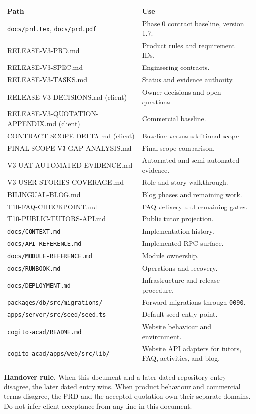 \documentclass[11pt,a4paper]{article}
\newcommand{\code}[1]{\texttt{#1}}
\begin{document}
{\footnotesize
\begin{tabular}{@{}L{7.2cm}L{8.4cm}@{}}
\toprule
\textbf{Path} & \textbf{Use} \\
\midrule
\code{docs/prd.tex}, \code{docs/prd.pdf} & Phase 0 contract baseline, version 1.7. \\
RELEASE-V3-PRD.md & Product rules and requirement IDs. \\
RELEASE-V3-SPEC.md & Engineering contracts. \\
RELEASE-V3-TASKS.md & Status and evidence authority. \\
RELEASE-V3-DECISIONS.md (client) & Owner decisions and open questions. \\
RELEASE-V3-QUOTATION-APPENDIX.md (client) & Commercial baseline. \\
CONTRACT-SCOPE-DELTA.md (client) & Baseline versus additional scope. \\
FINAL-SCOPE-V3-GAP-ANALYSIS.md & Final-scope comparison. \\
V3-UAT-AUTOMATED-EVIDENCE.md & Automated and semi-automated evidence. \\
V3-USER-STORIES-COVERAGE.md & Role and story walkthrough. \\
BILINGUAL-BLOG.md & Blog phases and remaining work. \\
T10-FAQ-CHECKPOINT.md & FAQ delivery and remaining gates. \\
T10-PUBLIC-TUTORS-API.md & Public tutor projection. \\
\code{docs/CONTEXT.md} & Implementation history. \\
\code{docs/API-REFERENCE.md} & Implemented RPC surface. \\
\code{docs/MODULE-REFERENCE.md} & Module ownership. \\
\code{docs/RUNBOOK.md} & Operations and recovery. \\
\code{docs/DEPLOYMENT.md} & Infrastructure and release procedure. \\
\code{packages/db/src/migrations/} & Forward migrations through \code{0090}. \\
\code{apps/server/src/seed/seed.ts} & Default seed entry point. \\
\code{cogito-acad/README.md} & Website behaviour and environment. \\
\code{cogito-acad/apps/web/src/lib/} & Website API adapters for tutors, FAQ, activities, and blog. \\
\bottomrule
\end{tabular}
}

\vspace{1em}
\noindent\textbf{Handover rule.} When this document and a later dated repository entry disagree, the later dated entry wins. When product behaviour and commercial terms disagree, the PRD and the accepted quotation own their separate domains. Do not infer client acceptance from any line in this document.
\end{document}
